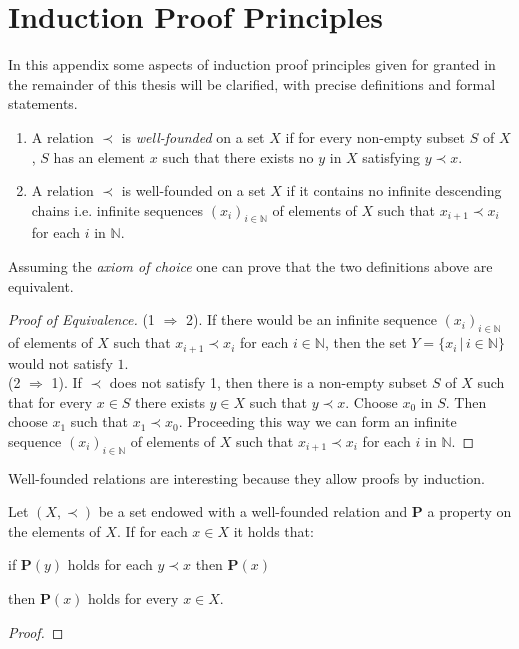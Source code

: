 \chapter{Induction Proof Principles}
In this appendix some aspects of induction proof principles given for granted in the remainder of this thesis will be clarified, with precise definitions and formal statements.
\begin{definition}\hfill
	\begin{enumerate}
	\item A relation $\prec$ is \emph{well-founded} on a set $X$ if for every non-empty subset $S$ of $X$, $S$ has an  element $x$ such that there exists no $y$ in $X$ satisfying $y\prec x$.
	\item A relation $\prec$ is well-founded on a set $X$ if it contains no infinite descending chains i.e. infinite sequences $(x_i)_{i\in\mathbb{N}}$ of elements of $X$ such that $x_{i+1}\prec x_i$ for each $i$ in $\mathbb{N}$.
	\end{enumerate}
\end{definition}
Assuming the \emph{axiom of choice} one can prove that the two definitions above are equivalent.
\begin{proof}[Proof of Equivalence]
	(1 $\Rightarrow$ 2). If there would be an infinite sequence $(x_i)_{i\in\mathbb{N}}$ of elements of $X$ such that $x_{i+1}\prec x_i$ for each $i\in\mathbb{N}$, then the set $Y=\{x_i\,|\,i\in\mathbb{N}\}$ would not satisfy $1$.\\
	(2 $\Rightarrow$ 1). If $\prec$ does not satisfy 1, then there is a non-empty subset $S$ of $X$ such that for every $x\in S$ there exists $y\in X$ such that $y\prec x$. Choose $x_0$ in $S$. Then choose $x_1$ such that $x_1\prec x_0$. Proceeding this way we can form an infinite sequence $(x_i)_{i\in\mathbb{N}}$ of elements of $X$ such that $x_{i+1}\prec x_i$ for each $i$ in $\mathbb{N}$.
\end{proof}
Well-founded relations are interesting because they allow proofs by induction.
\begin{proposition}
	Let $(X,\prec)$ be a set endowed with a well-founded relation and $\mathbf{P}$ a property on the elements of $X$. If for each $x\in X$ it holds that: 
	\begin{center} if $\mathbf{P}(y)$ holds  for each $y\prec x$ then $\mathbf{P}(x)$\end{center}
	then $\mathbf{P}(x)$ holds for every $x\in X$.
\end{proposition}
\begin{proof}
\end{proof}

